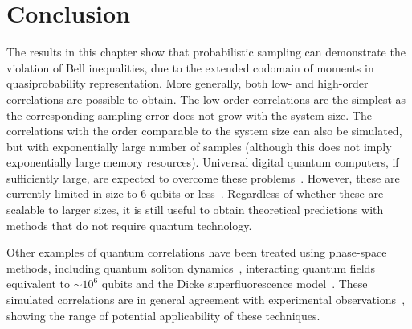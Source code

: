 \section{Conclusion}

The results in this chapter show that probabilistic sampling can demonstrate the violation of Bell inequalities, due to the extended codomain of moments in quasiprobability representation.
More generally, both low- and high-order correlations are possible to obtain.
The low-order correlations are the simplest as the corresponding sampling error does not grow with the system size.
The correlations with the order comparable to the system size can also be simulated, but with exponentially large number of samples (although this does not imply exponentially large memory resources).
Universal digital quantum computers, if sufficiently large, are expected to overcome these problems~\cite{Lloyd1996}.
However, these are currently limited in size to 6 qubits or less~\cite{Lanyon2011}.
Regardless of whether these are scalable to larger sizes, it is still useful to obtain theoretical predictions with methods that do not require quantum technology.

Other examples of quantum correlations have been treated using phase-space methods, including quantum soliton dynamics~\cite{Drummond1993a}, interacting quantum fields~\cite{Deuar2007} equivalent to $\sim10^{6}$ qubits and the Dicke superfluorescence model~\cite{Altland2012}.
These simulated correlations are in general agreement with experimental observations~\cite{Jaskula2010}, showing the range of potential applicability of these techniques.
